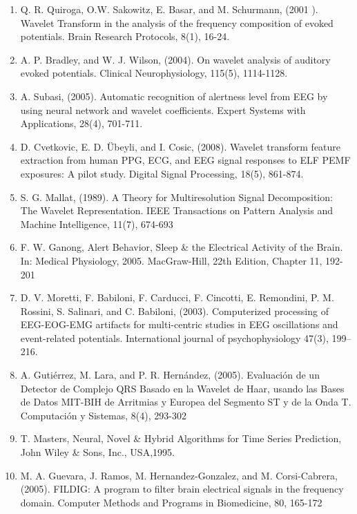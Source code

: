 \documentclass[12pt, a4paper]{article}
\begin{document}
\begin{enumerate}
\item  Q. R. Quiroga, O.W. Sakowitz, E. Basar, and M. Schurmann, (2001 ). Wavelet Transform in the analysis of the frequency composition of evoked potentials. Brain Research Protocols, 8(1), 16-24.

\item  A. P. Bradley, and W. J. Wilson, (2004). On wavelet analysis of auditory evoked potentials. Clinical Neurophysiology, 115(5), 1114-1128.


\item  A. Subasi, (2005). Automatic recognition of alertness level from EEG by using neural network and wavelet coefficients. Expert Systems with Applications, 28(4), 701-711.

\item  D. Cvetkovic, E. D. Übeyli, and I. Cosic, (2008). Wavelet transform feature extraction from human PPG, ECG, and EEG signal responses to ELF PEMF exposures: A pilot study. Digital Signal Processing, 18(5), 861-874.

\item  S. G. Mallat, (1989). A Theory for Multiresolution Signal Decomposition: The Wavelet Representation. IEEE Transactions on Pattern Analysis and Machine Intelligence, 11(7), 674-693

\item  F. W. Ganong, Alert Behavior, Sleep \& the Electrical Activity of the Brain. In: Medical Physiology, 2005. MacGraw-Hill, 22th Edition, Chapter 11, 192-201

\item  D. V. Moretti, F. Babiloni, F. Carducci, F. Cincotti, E. Remondini, P. M. Rossini, S. Salinari, and C. Babiloni, (2003). Computerized processing of EEG-EOG-EMG artifacts for multi-centric studies in EEG oscillations and event-related potentials. International journal of psychophysiology 47(3), 199–216.

\item  A. Gutiérrez, M. Lara, and P. R. Hernández, (2005). Evaluación de un Detector de Complejo QRS Basado en la Wavelet de Haar, usando las Bases de Datos MIT-BIH de Arritmias y Europea del Segmento ST y de la Onda T. Computación y Sistemas, 8(4), 293-302

\item  T. Masters, Neural, Novel \& Hybrid Algorithms for Time Series Prediction, John
Wiley \& Sons, Inc., USA,1995.

\item  M. A. Guevara, J. Ramos, M. Hernandez-Gonzalez, and M. Corsi-Cabrera, (2005). FILDIG: A program to filter brain electrical signals in the frequency domain. Computer Methods and Programs in Biomedicine, 80, 165-172


\end{enumerate}
\end{document}
